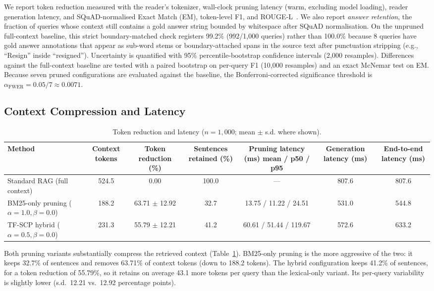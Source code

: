 \documentclass[conference]{IEEEtran}
\begin{document}
We report token reduction measured with the reader's tokenizer, wall-clock pruning latency (warm, excluding model loading), reader generation latency, and SQuAD-normalised Exact Match (EM), token-level F1, and ROUGE-L~\cite{lin2004rouge}. We also report \emph{answer retention}, the fraction of queries whose context still contains a gold answer string bounded by whitespace after SQuAD normalisation. On the unpruned full-context baseline, this strict boundary-matched check registers 99.2\% (992/1,000 queries) rather than 100.0\% because 8 queries have gold answer annotations that appear as sub-word stems or boundary-attached spans in the source text after punctuation stripping (e.g., ``Resign'' inside ``resigned''). Uncertainty is quantified with 95\% percentile-bootstrap confidence intervals (2,000 resamples). Differences against the full-context baseline are tested with a paired bootstrap on per-query F1 (10,000 resamples) and an exact McNemar test on EM. Because seven pruned configurations are evaluated against the baseline, the Bonferroni-corrected significance threshold is $\alpha_{\mathrm{FWER}} = 0.05 / 7 \approx 0.0071$.

\subsection{Context Compression and Latency}

\begin{table}[t]
\centering
\caption{Token reduction and latency ($n = 1,000$; mean $\pm$ s.d. where shown).}
\label{tab:latency}
\begin{tabular}{@{}lcccccc@{}}
\toprule
Method & Context tokens & Token reduction (\%) & Sentences retained (\%) & Pruning latency (ms) mean / p50 / p95 & Generation latency (ms) & End-to-end latency (ms) \\
\midrule
Standard RAG (full context) & 524.5 & 0.00 & 100.0 & --- & 807.6 & 807.6 \\
BM25-only pruning ($\alpha = 1.0, \beta = 0.0$) & 188.2 & 63.71 $\pm$ 12.92 & 32.7 & 13.75 / 11.22 / 24.51 & 531.0 & 544.8 \\
TF-SCP hybrid ($\alpha = 0.5, \beta = 0.0$) & 231.3 & 55.79 $\pm$ 12.21 & 41.2 & 60.61 / 51.44 / 119.67 & 572.6 & 633.2 \\
\bottomrule
\end{tabular}
\end{table}

Both pruning variants substantially compress the retrieved context (Table~\ref{tab:latency}). BM25-only pruning is the more aggressive of the two: it keeps 32.7\% of sentences and removes 63.71\% of context tokens (down to 188.2 tokens). The hybrid configuration keeps 41.2\% of sentences, for a token reduction of 55.79\%, so it retains on average 43.1 more tokens per query than the lexical-only variant. Its per-query variability is slightly lower (s.d.\ 12.21 vs.\ 12.92 percentage points).
\end{document}
